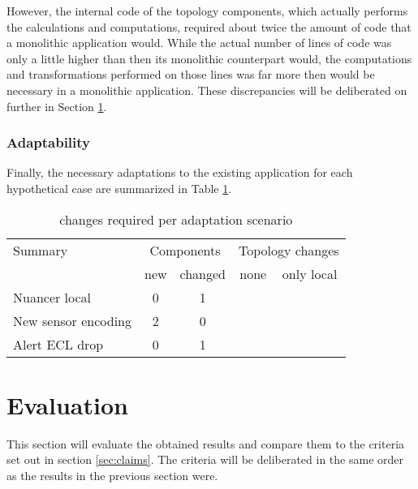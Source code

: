 However, the internal code of the topology components, which actually performs the calculations and computations, required about twice the amount of code that a monolithic application would. While the actual number of lines of code was only a little higher than then its monolithic counterpart would, the computations and transformations performed on those lines was far more then would be necessary in a monolithic application. These discrepancies will be deliberated on further in Section \ref{sec:eval}.

\subsubsection{Adaptability}
Finally, the necessary adaptations to the existing application for each hypothetical case are summarized in Table \ref{table:adaptations}.

\begin{table}
\centering
\begin{tabular}{|l||c|c||c|c|} \hline
Summary				& \multicolumn{2}{c||}{Components}		& \multicolumn{2}{c|}{Topology changes} \\ 
					& new 	& changed 	& none 		& only local  \\ \hline 
Nuancer local		& 0		& 1			&			& \cmark \\ \hline
New sensor encoding	& 2		& 0			& 			& \cmark \\ \hline
Alert ECL drop		& 0		& 1			& \cmark	&		 \\ \hline
\end{tabular}
\caption{changes required per adaptation scenario}
\label{table:adaptations}
\end{table}

\section{Evaluation}
\label{sec:eval}
This section will evaluate the obtained results and compare them to the criteria set out in section \ref{sec:claims}. The criteria will be deliberated in the same order as the results in the previous section were.


